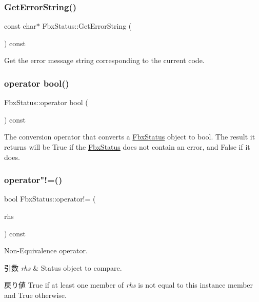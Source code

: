 \subsubsection{\texorpdfstring{Get\+Error\+String()}{GetErrorString()}}
{\footnotesize\ttfamily const char$\ast$ Fbx\+Status\+::\+Get\+Error\+String (\begin{DoxyParamCaption}{ }\end{DoxyParamCaption}) const}



Get the error message string corresponding to the current code. 

\mbox{\label{class_fbx_status_af364552fc78b2b02f09bc7dcccbbbe92}} 
\subsubsection{\texorpdfstring{operator bool()}{operator bool()}}
{\footnotesize\ttfamily Fbx\+Status\+::operator bool (\begin{DoxyParamCaption}{ }\end{DoxyParamCaption}) const}

The conversion operator that converts a \hyperlink{class_fbx_status}{Fbx\+Status} object to bool. The result it returns will be {\ttfamily True} if the \hyperlink{class_fbx_status}{Fbx\+Status} does not contain an error, and {\ttfamily False} if it does. \mbox{\label{class_fbx_status_a832f10e5d0469a191a0cd845c60525b3}} 
\subsubsection{\texorpdfstring{operator"!=()}{operator!=()}\hspace{0.1cm}{\footnotesize\ttfamily [1/2]}}
{\footnotesize\ttfamily bool Fbx\+Status\+::operator!= (\begin{DoxyParamCaption}\item[{const \hyperlink{class_fbx_status}{Fbx\+Status} \&}]{rhs }\end{DoxyParamCaption}) const}

Non-\/\+Equivalence operator. 
\begin{DoxyParams}{引数}
{\em rhs} & Status object to compare. \\
\hline
\end{DoxyParams}
\begin{DoxyReturn}{戻り値}
{\ttfamily True} if at least one member of {\itshape rhs} is not equal to this instance member and {\ttfamily True} otherwise. 
\end{DoxyReturn}
\mbox{\label{class_fbx_status_a1f05b05e754a2a8f763f567b0b458010}} 
